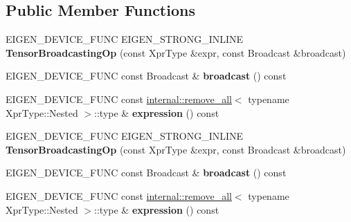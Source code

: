 \subsection*{Public Member Functions}
\begin{DoxyCompactItemize}
\item 
\mbox{\label{class_eigen_1_1_tensor_broadcasting_op_ac0fcf7b9512535162dc8ee9e6b278357}} 
E\+I\+G\+E\+N\+\_\+\+D\+E\+V\+I\+C\+E\+\_\+\+F\+U\+NC E\+I\+G\+E\+N\+\_\+\+S\+T\+R\+O\+N\+G\+\_\+\+I\+N\+L\+I\+NE {\bfseries Tensor\+Broadcasting\+Op} (const Xpr\+Type \&expr, const Broadcast \&broadcast)
\item 
\mbox{\label{class_eigen_1_1_tensor_broadcasting_op_a85e70f4fc657b1af55dc49aa9172036a}} 
E\+I\+G\+E\+N\+\_\+\+D\+E\+V\+I\+C\+E\+\_\+\+F\+U\+NC const Broadcast \& {\bfseries broadcast} () const
\item 
\mbox{\label{class_eigen_1_1_tensor_broadcasting_op_a55629dfbc091c80d710ec909f9d9fdfe}} 
E\+I\+G\+E\+N\+\_\+\+D\+E\+V\+I\+C\+E\+\_\+\+F\+U\+NC const \hyperlink{struct_eigen_1_1internal_1_1remove__all}{internal\+::remove\+\_\+all}$<$ typename Xpr\+Type\+::\+Nested $>$\+::type \& {\bfseries expression} () const
\item 
\mbox{\label{class_eigen_1_1_tensor_broadcasting_op_ac0fcf7b9512535162dc8ee9e6b278357}} 
E\+I\+G\+E\+N\+\_\+\+D\+E\+V\+I\+C\+E\+\_\+\+F\+U\+NC E\+I\+G\+E\+N\+\_\+\+S\+T\+R\+O\+N\+G\+\_\+\+I\+N\+L\+I\+NE {\bfseries Tensor\+Broadcasting\+Op} (const Xpr\+Type \&expr, const Broadcast \&broadcast)
\item 
\mbox{\label{class_eigen_1_1_tensor_broadcasting_op_a85e70f4fc657b1af55dc49aa9172036a}} 
E\+I\+G\+E\+N\+\_\+\+D\+E\+V\+I\+C\+E\+\_\+\+F\+U\+NC const Broadcast \& {\bfseries broadcast} () const
\item 
\mbox{\label{class_eigen_1_1_tensor_broadcasting_op_a55629dfbc091c80d710ec909f9d9fdfe}} 
E\+I\+G\+E\+N\+\_\+\+D\+E\+V\+I\+C\+E\+\_\+\+F\+U\+NC const \hyperlink{struct_eigen_1_1internal_1_1remove__all}{internal\+::remove\+\_\+all}$<$ typename Xpr\+Type\+::\+Nested $>$\+::type \& {\bfseries expression} () const
\end{DoxyCompactItemize}
